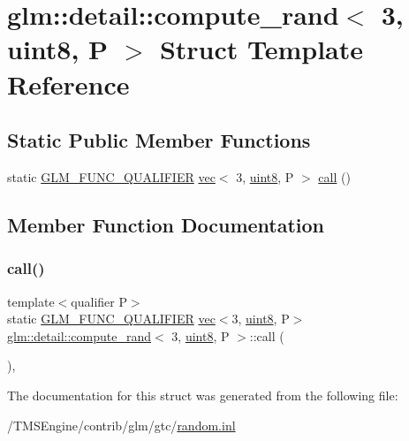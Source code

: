 \hypertarget{structglm_1_1detail_1_1compute__rand_3_013_00_01uint8_00_01_p_01_4}{}\section{glm\+:\+:detail\+:\+:compute\+\_\+rand$<$ 3, uint8, P $>$ Struct Template Reference}
\label{structglm_1_1detail_1_1compute__rand_3_013_00_01uint8_00_01_p_01_4}
\subsection*{Static Public Member Functions}
\begin{DoxyCompactItemize}
\item 
static \hyperlink{setup_8hpp_a33fdea6f91c5f834105f7415e2a64407}{G\+L\+M\+\_\+\+F\+U\+N\+C\+\_\+\+Q\+U\+A\+L\+I\+F\+I\+ER} \hyperlink{structglm_1_1vec}{vec}$<$ 3, \hyperlink{namespaceglm_1_1detail_aef2588f97d090cc19fbbe0c74fe17c8f}{uint8}, P $>$ \hyperlink{structglm_1_1detail_1_1compute__rand_3_013_00_01uint8_00_01_p_01_4_a1c4fe17e05c4f573144b285f20675ec5}{call} ()
\end{DoxyCompactItemize}


\subsection{Member Function Documentation}
\mbox{\label{structglm_1_1detail_1_1compute__rand_3_013_00_01uint8_00_01_p_01_4_a1c4fe17e05c4f573144b285f20675ec5}} 
\subsubsection{\texorpdfstring{call()}{call()}}
{\footnotesize\ttfamily template$<$qualifier P$>$ \\
static \hyperlink{setup_8hpp_a33fdea6f91c5f834105f7415e2a64407}{G\+L\+M\+\_\+\+F\+U\+N\+C\+\_\+\+Q\+U\+A\+L\+I\+F\+I\+ER} \hyperlink{structglm_1_1vec}{vec}$<$3, \hyperlink{namespaceglm_1_1detail_aef2588f97d090cc19fbbe0c74fe17c8f}{uint8}, P$>$ \hyperlink{structglm_1_1detail_1_1compute__rand}{glm\+::detail\+::compute\+\_\+rand}$<$ 3, \hyperlink{namespaceglm_1_1detail_aef2588f97d090cc19fbbe0c74fe17c8f}{uint8}, P $>$\+::call (\begin{DoxyParamCaption}{ }\end{DoxyParamCaption})\hspace{0.3cm}{\ttfamily [inline]}, {\ttfamily [static]}}



The documentation for this struct was generated from the following file\+:\begin{DoxyCompactItemize}
\item 
/\+T\+M\+S\+Engine/contrib/glm/gtc/\hyperlink{random_8inl}{random.\+inl}\end{DoxyCompactItemize}

